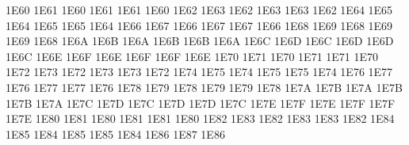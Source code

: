 \setcclcuc 1E60 1E61 1E60 %
\setcclcuc 1E61 1E61 1E60 %
\setcclcuc 1E62 1E63 1E62 %
\setcclcuc 1E63 1E63 1E62 %
\setcclcuc 1E64 1E65 1E64 %
\setcclcuc 1E65 1E65 1E64 %
\setcclcuc 1E66 1E67 1E66 %
\setcclcuc 1E67 1E67 1E66 %
\setcclcuc 1E68 1E69 1E68 %
\setcclcuc 1E69 1E69 1E68 %
\setcclcuc 1E6A 1E6B 1E6A %
\setcclcuc 1E6B 1E6B 1E6A %
\setcclcuc 1E6C 1E6D 1E6C %
\setcclcuc 1E6D 1E6D 1E6C %
\setcclcuc 1E6E 1E6F 1E6E %
\setcclcuc 1E6F 1E6F 1E6E %
\setcclcuc 1E70 1E71 1E70 %
\setcclcuc 1E71 1E71 1E70 %
\setcclcuc 1E72 1E73 1E72 %
\setcclcuc 1E73 1E73 1E72 %
\setcclcuc 1E74 1E75 1E74 %
\setcclcuc 1E75 1E75 1E74 %
\setcclcuc 1E76 1E77 1E76 %
\setcclcuc 1E77 1E77 1E76 %
\setcclcuc 1E78 1E79 1E78 %
\setcclcuc 1E79 1E79 1E78 %
\setcclcuc 1E7A 1E7B 1E7A %
\setcclcuc 1E7B 1E7B 1E7A %
\setcclcuc 1E7C 1E7D 1E7C %
\setcclcuc 1E7D 1E7D 1E7C %
\setcclcuc 1E7E 1E7F 1E7E %
\setcclcuc 1E7F 1E7F 1E7E %
\setcclcuc 1E80 1E81 1E80 %
\setcclcuc 1E81 1E81 1E80 %
\setcclcuc 1E82 1E83 1E82 %
\setcclcuc 1E83 1E83 1E82 %
\setcclcuc 1E84 1E85 1E84 %
\setcclcuc 1E85 1E85 1E84 %
\setcclcuc 1E86 1E87 1E86 %
